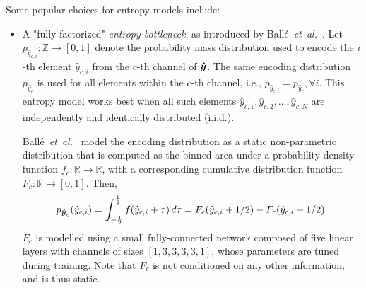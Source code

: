 
Some popular choices for entropy models include:
%
\begin{itemize}

  \item
    A "fully factorized" \emph{entropy bottleneck}, as introduced by Ballé~\emph{et~al.}~\cite{balle2018variational}.
    Let $p_{{\hat{y}}_{c,i}} : \mathbb{Z} \to [0, 1]$ denote the probability mass distribution used to encode the $i$-th element $\hat{y}_{c,i}$ from the $c$-th channel of ${\boldsymbol{\hat{y}}}$.
    The same encoding distribution $p_{{\hat{y}}_c}$ is used for all elements within the $c$-th channel, i.e., $p_{{\hat{y}}_{c,i}} = p_{{\hat{y}}_c}, \forall i$.
    This entropy model works best when all such elements $\hat{y}_{c,1}, \hat{y}_{c,2}, \ldots, \hat{y}_{c,N}$ are independently and identically distributed (i.i.d.).

    Ballé~\emph{et~al.}~\cite{balle2018variational} model the encoding distribution as a static non-parametric distribution that is computed as the binned area under a probability density function $f_{c} : \mathbb{R} \to \mathbb{R}$, with a corresponding cumulative distribution function $F_{c} : \mathbb{R} \to [0, 1]$.
    Then,
    \begin{equation}
      \label{eqn:p_y_c_integral}
      p_{{\boldsymbol{\hat{y}}}_c}(\hat{y}_{c,i})
      = \int_{-\frac{1}{2}}^{\frac{1}{2}} f(\hat{y}_{c,i} + \tau) \, d\tau
      = F_{c}(\hat{y}_{c,i} + 1/2) - F_{c}(\hat{y}_{c,i} - 1/2).
    \end{equation}
    $F_{c}$ is modelled using a small fully-connected network composed of five linear layers with channels of sizes $[1, 3, 3, 3, 3, 1]$, whose parameters are tuned during training.
    Note that $F_{c}$ is not conditioned on any other information, and is thus static.


\end{itemize}
